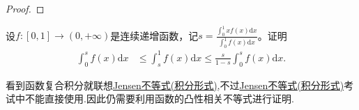 \documentclass[../../main.tex]{subfiles}%
\begin{document}
\begin{proof}
\end{proof}

\begin{example}
设$f:[0,1]\to(0,+\infty)$是连续递增函数，记$s = \frac{\int_{0}^{1}xf(x)\mathrm{d}x}{\int_{0}^{1}f(x)\mathrm{d}x}$。证明
\begin{align*}
\int_{0}^{s}f(x)\mathrm{d}x&\leqslant\int_{s}^{1}f(x)\mathrm{d}x\leqslant\frac{s}{1 - s}\int_{0}^{s}f(x)\mathrm{d}x.
\end{align*}
\end{example}
\begin{note}
看到函数复合积分就联想\hyperref[theorem:Jensen不等式积分形式]{Jensen不等式(积分形式)},不过\hyperref[theorem:Jensen不等式积分形式]{Jensen不等式(积分形式)}考试中不能直接使用.因此仍需要利用函数的凸性相关不等式进行证明.
\end{note}
\end{document}
